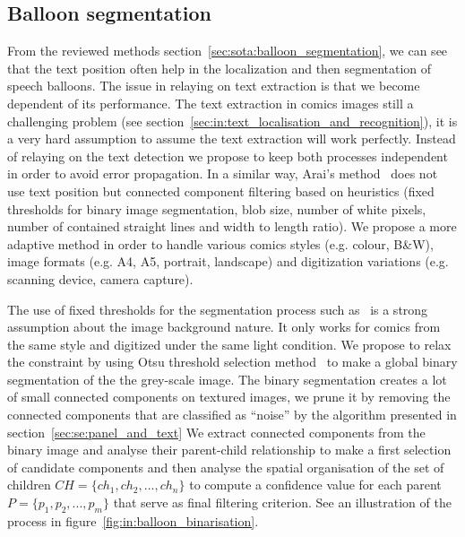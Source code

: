 \subsection{Balloon segmentation} %
\label{sub:in:balloon_segmentation}
From the reviewed methods section~\ref{sec:sota:balloon_segmentation}, we can see that the text position often help in the localization and then segmentation of speech balloons.
The issue in relaying on text extraction is that we become dependent of its performance.
The text extraction in comics images still a challenging problem (see section~\ref{sec:in:text_localisation_and_recognition}), it is a very hard assumption to assume the text extraction will work perfectly. 
Instead of relaying on the text detection we propose to keep both processes independent in order to avoid error propagation.
In a similar way, Arai's method~\cite{Arai11} does not use text position but connected component filtering based on heuristics (fixed thresholds for binary image segmentation, blob size, number of white pixels, number of contained straight lines and width to length ratio). 
We propose a more adaptive method in order to handle various comics styles (e.g. colour, B\&W), image formats (e.g. A4, A5, portrait, landscape) and digitization variations (e.g. scanning device, camera capture).

The use of fixed thresholds for the segmentation process such as~\cite{Arai11} is a strong assumption about the image background nature.
It only works for comics from the same style and digitized under the same light condition.
We propose to relax the constraint by using Otsu threshold selection method~\cite{otsu79} to make a global binary segmentation of the the grey-scale image.
The binary segmentation creates a lot of small connected components on textured images, we prune it by removing the connected components that are classified as ``noise'' by the algorithm presented in section~\ref{sec:se:panel_and_text}
We extract connected components from the binary image and analyse their parent-child relationship to make a first selection of candidate components and then analyse the spatial organisation of the set of children $CH=\{ch_1, ch_2,...,ch_n\}$ to compute a confidence value for each parent $P=\{p_1, p_2,...,p_m\}$ that serve as final filtering criterion.
See an illustration of the process in figure~\ref{fig:in:balloon_binarisation}.

